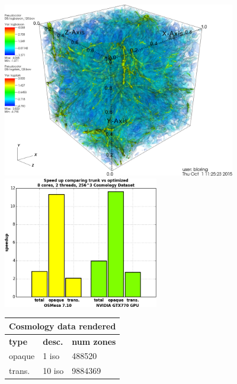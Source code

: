 \documentclass[a4paper,10pt]{report}
\begin{document}
\begin{figure}
\begin{minipage}{0.56\textwidth}
\includegraphics[height=3.0in]{./cosmology_test_case_0080.png} 
\end{minipage}
\begin{minipage}{0.30\textwidth}
\includegraphics[height=2.25in]{./speed_up_cosmo.png} 
\end{minipage}
\begin{minipage}{1.0\textwidth}
\begin{center}
\vspace{0.05in}
{\footnotesize
\def\arraystretch{1.25}
\begin{tabular}{|l|l|l|}
\hline
\multicolumn{3}{|c|}{\bf{Cosmology data rendered}} \\ \hline
{\bf type} & {\bf desc.} & {\bf num zones} \\ \hline
opaque & 1 iso & 488520 \\ \hline
trans. & 10 iso & 9884369 \\ \hline
\end{tabular}} \vspace{0.05in}

\end{center}
\end{minipage}
\end{figure}
\end{document}

